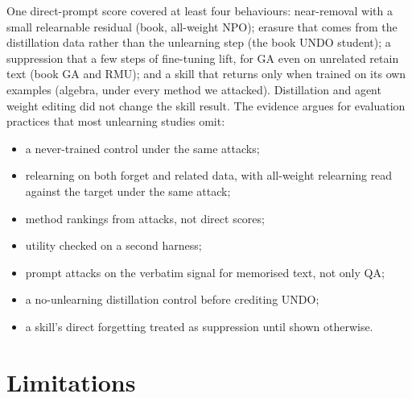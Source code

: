 \documentclass[10pt,twocolumn,letterpaper]{article}
\begin{document}
One direct-prompt score covered at least four behaviours: near-removal with a small relearnable residual (book,
all-weight NPO); erasure that comes from the distillation data rather than the unlearning step (the book UNDO student); a
suppression that a few steps of fine-tuning lift, for GA even on unrelated retain text (book GA and RMU); and a skill that
returns only when trained on its own examples (algebra, under every method we attacked). Distillation and agent weight
editing did not change the skill result. The evidence argues for evaluation practices that most
unlearning studies omit:
\begin{itemize}
\item a never-trained control under the same attacks;
\item relearning on both forget and related data, with all-weight relearning read against the target under the same
attack;
\item method rankings from attacks, not direct scores;
\item utility checked on a second harness;
\item prompt attacks on the verbatim signal for memorised text, not only QA;
\item a no-unlearning distillation control before crediting UNDO;
\item a skill's direct forgetting treated as suppression until shown otherwise.
\end{itemize}

\section{Limitations}
\end{document}
